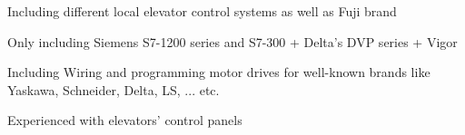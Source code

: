 \documentclass[10pt]{extarticle}
\begin{document}
\begin{skillbox}[title = Technical skills]
\begin{description}[nosep]
	\item[Elevator Troubleshooting]\dotfill \space {}\par
	\begin{detailbox} 
	Including different local elevator control systems as well as Fuji brand
	\end{detailbox} 
	\item[PLC]\dotfill \space {}\par
	\begin{detailbox} 
	Only including Siemens S7-1200 series and S7-300 + Delta's DVP series + Vigor
	\end{detailbox} 
	\item[Motor Drives]\dotfill \space {}\par
	\begin{detailbox} 
	Including Wiring and programming motor drives for well-known brands like Yaskawa, Schneider, Delta, LS, ... etc.
	\end{detailbox} 
	\item[Control Panel designing/assembly]\dotfill \space {}\par
	\begin{detailbox} 
	Experienced with elevators' control panels
	\end{detailbox} 

\end{description}
\end{skillbox}
\end{document}
